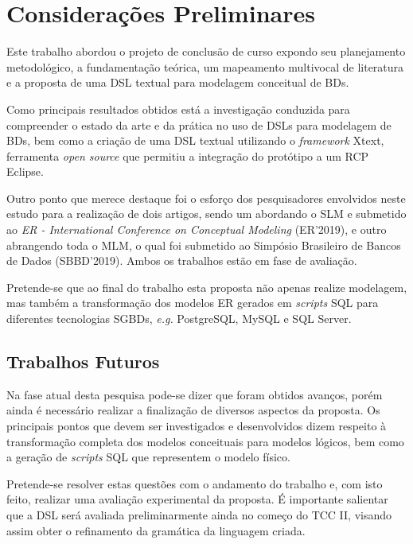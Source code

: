 \chapter{Considerações Preliminares}\label{consideracoesPreliminares}

Este trabalho abordou o projeto de conclusão de curso expondo seu planejamento metodológico, a fundamentação teórica, um mapeamento multivocal de literatura e a proposta de uma \ac{DSL} textual para modelagem conceitual de \acp{BD}.

Como principais resultados obtidos está a investigação conduzida para compreender o estado da arte e da prática no uso de \acp{DSL} para modelagem de \acp{BD}, bem como a criação de uma \ac{DSL} textual utilizando o \textit{framework} Xtext, ferramenta \textit{open source} que permitiu a integração do protótipo a um \ac{RCP} Eclipse. 

Outro ponto que merece destaque foi o esforço dos pesquisadores envolvidos neste estudo para a realização de dois artigos, sendo um abordando o \ac{SLM} e submetido ao \textit{ER - International Conference on Conceptual Modeling} (ER'2019), e outro abrangendo toda o \ac{MLM}, o qual foi submetido ao Simpósio Brasileiro de Bancos de Dados (SBBD'2019). Ambos os trabalhos estão em fase de avaliação.

Pretende-se que ao final do trabalho esta proposta não apenas realize modelagem, mas também a transformação dos modelos \ac{ER} gerados em \textit{scripts} \ac{SQL} para diferentes tecnologias \acp{SGBD}, \textit{e.g.} PostgreSQL, MySQL e SQL Server.

\section{Trabalhos Futuros}

Na fase atual desta pesquisa pode-se dizer que foram obtidos avanços, porém ainda é necessário realizar a finalização de diversos aspectos da proposta. 
Os principais pontos que devem ser investigados e desenvolvidos dizem respeito à transformação completa dos modelos conceituais para modelos lógicos, bem como a geração de \textit{scripts} \ac{SQL} que representem o modelo físico.

Pretende-se resolver estas questões com o andamento do trabalho e, com isto feito, realizar uma avaliação experimental da proposta. 
É importante salientar que a \ac{DSL} será avaliada preliminarmente ainda no começo do \ac{TCC} II, visando assim obter o refinamento da gramática da linguagem criada.

